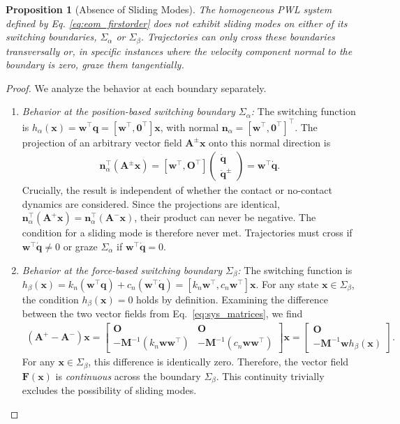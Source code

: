 \documentclass[a4paper,9pt,parskip=half,english]{article}
\theoremstyle{plain}
\newtheorem{proposition}{Proposition}
\theoremstyle{definition}
\newcommand{\T}{^{\!\top}} %
\newcommand{\vn}{\mathbf n}
\newcommand{\vq}{\mathbf q}
\newcommand{\vw}{\mathbf w}
\newcommand{\vx}{\mathbf x}
\newcommand{\vA}{\mathbf A}
\newcommand{\vF}{\mathbf F}
\newcommand{\vM}{\mathbf M}
\newcommand{\vO}{\mathbf O}
\begin{document}
\begin{proposition}[Absence of Sliding Modes]\label{prop:no_sliding}
	The homogeneous PWL system defined by Eq. \eqref{eq:eom_firstorder} does not exhibit sliding modes on either of its switching boundaries, $\Sigma_{\alpha}$ or $\Sigma_{\beta}$. Trajectories can only cross these boundaries transversally or, in specific instances where the velocity component normal to the boundary is zero, graze them tangentially.
\end{proposition}
\begin{proof}
	We analyze the behavior at each boundary separately.
	\begin{enumerate}
		\item \textit{Behavior at the position-based switching boundary $\Sigma_{\alpha}$:} The switching function is $h_{\alpha}(\vx) = \vw\T\vq = [ \vw\T, \bm{0}\T ]\vx$, with normal $\vn_{\alpha} = [ \vw\T, \bm{0}\T]\T$. The projection of an arbitrary vector field $\vA^{\pm}\vx$ onto this normal direction is
		\begin{align}
			\vn_{\alpha}\T (\vA^{\pm}\vx) = [ \vw\T, \vO\T] \begin{pmatrix} \dot{\vq} \\ \ddot{\vq}^{\pm} \end{pmatrix} =  \vw\T\dot{\vq}.
		\end{align}
		Crucially, the result is independent of whether the contact or no-contact dynamics are considered. Since the projections are identical, $\vn_{\alpha}\T (\vA^+\vx) = \vn_{\alpha}\T (\vA^-\vx)$, their product can never be negative. The condition for a sliding mode is therefore never met. Trajectories must cross if $ \vw\T \dot{\vq} \neq 0$ or graze $\Sigma_{\alpha}$ if $ \vw\T \dot{\vq} = 0$.
		
		\item \textit{Behavior at the force-based switching boundary $\Sigma_{\beta}$:} The switching function is $h_{\beta}(\vx) = k_n(\vw\T\vq) + c_n(\vw\T\dot{\vq}) = [ k_n\vw\T,  c_n\vw\T]\vx$. For any state $\vx \in \Sigma_{\beta}$, the condition $h_{\beta}(\vx) = 0$ holds by definition. Examining the difference between the two vector fields from Eq.~\eqref{eq:sys_matrices}, we find
		\begin{align}
			(\vA^+ - \vA^-)\vx = \begin{bmatrix} \vO & \vO \\ -\vM^{-1}(k_n\vw\vw\T) & -\vM^{-1}(c_n\vw\vw\T) \end{bmatrix} \vx = \begin{bmatrix} \vO \\ - \vM^{-1}\vw h_{\beta}(\vx) \end{bmatrix}.
		\end{align}
		For any $\vx \in \Sigma_{\beta}$, this difference is identically zero. Therefore, the vector field $\vF(\vx)$ is \textit{continuous} across the boundary $\Sigma_{\beta}$. This continuity trivially excludes the possibility of sliding modes.
	\end{enumerate}
\end{proof}
\end{document}
